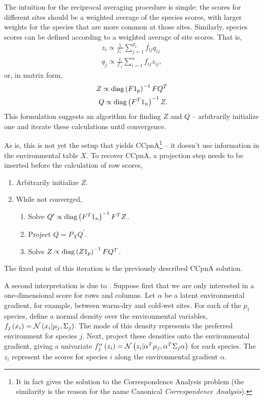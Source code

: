 \documentclass{article}
\begin{document}
The intuition for the reciprocal averaging procedure is simple: the scores for
different sites should be a weighted average of the species scores, with larger
weights for the species that are more common at those sites. Similarly, species
scores can be defined according to a weighted average of site scores. That is,
\begin{align*}
  z_{i} \propto \frac{1}{f_{i\cdot}}\sum_{j = 1}^{p_{1}}f_{ij}q_{ij} \\
  q_{j} \propto \frac{1}{f_{\cdot j}} \sum_{i = 1}^{n} f_{ij}z_{ij},
\end{align*}
or, in matrix form,
\begin{align*}
Z \propto \mathop\mathrm{diag}\left(F 1_{p}\right)^{-1} F Q^{T} \\
Q \propto \mathop\mathrm{diag}\left(F^{T} 1_{n}\right)^{-1} Z.
\end{align*}
This formulation suggests an algorithm for finding $Z$ and $Q$ -- arbitrarily
initialize one and iterate these calculations until convergence.

As is, this is not yet the setup that yields CCpnA\footnote{It in fact gives the
  solution to the Correspondence Analysis problem (the similarity is the reason
  for the name Canonical \textit{Correspondence Analysis}).} -- it doesn't use
information in the environmental table $X$. To recover CCpnA, a projection step
needs to be inserted before the calculation of row scores,
\begin{enumerate}
\item Arbitrarily initialize $Z$.
\item While not converged,
\begin{enumerate}
\item Solve $Q^{\prime} \propto \mathop\mathrm{diag}\left(F^{T}1_{n}\right)^{-1}F^{T}Z$.
\item Project $Q = P_{X}Q^{\prime}$.
\item Solve $Z \propto \mathop\mathrm{diag}\left(Z 1_{p}\right)^{-1} F Q^{T}$.
\end{enumerate}
\end{enumerate}

The fixed point of this iteration is the previously described CCpnA solution.

A second interpretation is due to \cite{zhu2005constrained}. Suppose first that
we are only interested in a one-dimensional score for rows and columns. Let
$\alpha$ be a latent environmental gradient, for example, between warm-dry and
cold-wet sites. For each of the $p_{1}$ species, define a normal density over
the environmental variables, $f_{j}\left(x_{i}\right) = \mathcal{N}\left(x_i \vert
\mu_{j}, \Sigma_{j}\right)$. The mode of this density represents the preferred
environment for species $j$. Next, project these densities onto the
environmental gradient, giving a univariate $f_{j}^{\alpha}\left(z_{i}\right) =
\mathcal{N}\left(z_i \vert \alpha^{T}\mu_{j}, \alpha^{T} \Sigma_{j}\alpha\right)$ for
each species. The $z_{i}$ represent the scores for species $i$ along the
environmental gradient $\alpha$.
\end{document}
